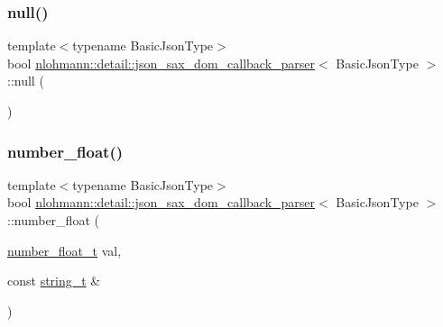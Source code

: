 \subsubsection{\texorpdfstring{null()}{null()}}
{\footnotesize\ttfamily template$<$typename Basic\+Json\+Type$>$ \\
bool \hyperlink{classnlohmann_1_1detail_1_1json__sax__dom__callback__parser}{nlohmann\+::detail\+::json\+\_\+sax\+\_\+dom\+\_\+callback\+\_\+parser}$<$ Basic\+Json\+Type $>$\+::null (\begin{DoxyParamCaption}{ }\end{DoxyParamCaption})\hspace{0.3cm}{\ttfamily [inline]}}

\mbox{\label{classnlohmann_1_1detail_1_1json__sax__dom__callback__parser_ae21f7872c334c77d03ae033cb0749b1c}} 
\subsubsection{\texorpdfstring{number\+\_\+float()}{number\_float()}}
{\footnotesize\ttfamily template$<$typename Basic\+Json\+Type$>$ \\
bool \hyperlink{classnlohmann_1_1detail_1_1json__sax__dom__callback__parser}{nlohmann\+::detail\+::json\+\_\+sax\+\_\+dom\+\_\+callback\+\_\+parser}$<$ Basic\+Json\+Type $>$\+::number\+\_\+float (\begin{DoxyParamCaption}\item[{\hyperlink{classnlohmann_1_1detail_1_1json__sax__dom__callback__parser_a914ea0555cea5290449fb791ae41c655}{number\+\_\+float\+\_\+t}}]{val,  }\item[{const \hyperlink{classnlohmann_1_1detail_1_1json__sax__dom__callback__parser_a00e7d95d82d5d8a43421526a42a8eabc}{string\+\_\+t} \&}]{ }\end{DoxyParamCaption})\hspace{0.3cm}{\ttfamily [inline]}}

\mbox{\label{classnlohmann_1_1detail_1_1json__sax__dom__callback__parser_a68d9eddfd572e8687c1c8107e0505aa6}} 
